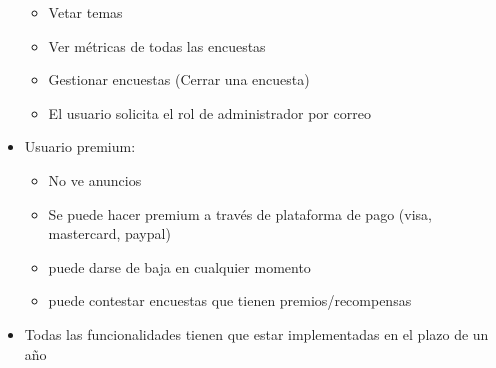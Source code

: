 \documentclass{article}
\begin{document}
\begin{itemize}
\begin{itemize}
            \item Vetar temas
            \item Ver métricas de todas las encuestas
            \item Gestionar encuestas (Cerrar una encuesta)
            \item El usuario solicita el rol de administrador por correo
        \end{itemize}
        \item Usuario premium:
        \begin{itemize}
            \item No ve anuncios
            \item Se puede hacer premium a través de plataforma de pago (visa, mastercard, paypal)
            \item puede darse de baja en cualquier momento
            \item puede contestar encuestas que tienen premios/recompensas
        \end{itemize}
        \item Todas las funcionalidades tienen que estar implementadas en el plazo de un año
	\end{itemize}
\end{document}

